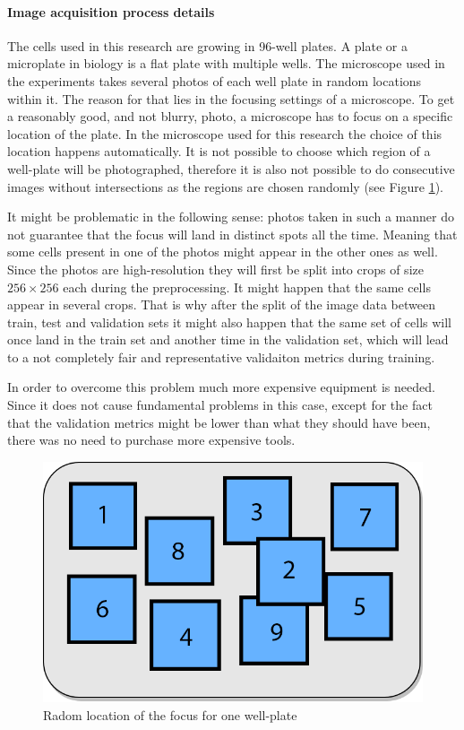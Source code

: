 \paragraph{Image acquisition process details} 
    The cells used in this research are growing in 96-well plates. A plate or a microplate in biology is a flat plate with multiple wells. The microscope used in the experiments takes several photos of each well plate in random locations within it. The reason for that lies in the focusing settings of a  microscope. To get a reasonably good, and not blurry, photo, a microscope has to focus on a specific location of the plate. In the microscope used for this research the choice of this location happens automatically. It is not possible to choose which region of a well-plate will be photographed, therefore it is also not possible to do consecutive images without intersections as the regions are chosen randomly (see Figure \ref{fig:random-dic}). 
    
    It might be problematic in the following sense: photos taken in such a manner do not guarantee that the focus will land in distinct spots all the time. Meaning that some cells present in one of the photos might appear in the other ones as well. Since the photos are high-resolution they will first be split into crops of size $256 \times 256$ each during the preprocessing. It might happen that the same cells appear in several crops. That is why after the split of the image data between train, test and validation sets it might also happen that the same set of cells will once land in the train set and another time in the validation set, which will lead to a not completely fair and representative validaiton metrics during training.
    
    In order to overcome this problem much more expensive equipment is needed. Since it does not cause fundamental problems in this case, except for the fact that the validation metrics might be lower than what they should have been, there was no need to purchase more expensive tools. 
    
    \begin{figure}[htb]
        \begin{center}
            \includegraphics[width=0.3\linewidth]{bilder/dic-random.png}
            \caption{Radom location of the focus for one well-plate}\label{fig:random-dic}
        \end{center}
    \end{figure}